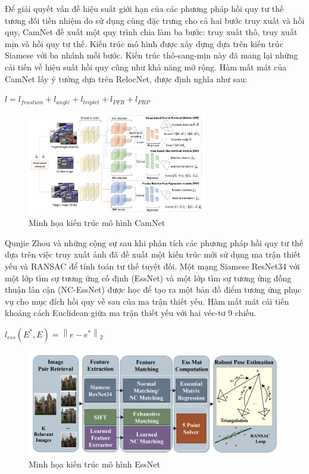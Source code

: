 Để giải quyết vấn đề hiệu suất giới hạn của các phương pháp hồi quy tư thế tương đối tiền nhiệm do sử dụng cùng đặc trưng cho cả hai bước truy xuất và hồi quy, CamNet \cite{9008579} đề xuất một quy trình chia làm ba bước: truy xuất thô, truy xuất mịn và hồi quy tư thế. Kiến trúc mô hình được xây dựng dựa trên kiến trúc Siamese với ba nhánh mỗi bước. Kiến trúc thô-sang-mịn này đã mang lại những cải tiến về hiệu suất hồi quy cũng như khả năng mở rộng. Hàm mất mát của CamNet lấy ý tưởng dựa trên RelocNet, được định nghĩa như sau:
\begin{center}
    $l = l_{frustum} + l_{angle} + l_{triplet} + l_{PFR} + l_{PRP}$
\end{center}
\begin{figure}[H]
    \centering
    \includegraphics[width=0.7\textwidth]{pics/Chapter2/camnet.png}
    \caption{Minh họa kiến trúc mô hình CamNet \cite{9008579}}
\end{figure}
Qunjie Zhou và những cộng sự \cite{zhou2020learn} sau khi phân tích các phương pháp hồi quy tư thế dựa trên việc truy xuất ảnh đã đề xuất một kiến trúc mới sử dụng ma trận thiết yếu và RANSAC để tính toán tư thế tuyệt đối. Một mạng Siamese ResNet34 với một lớp tìm sự tương ứng cố định (EssNet) và một lớp tìm sự tương ứng đồng thuận lân cận (NC-EssNet) được học để tạo ra một bản đồ điểm tương ứng phục vụ cho mục đích hồi quy về sau của ma trận thiết yếu. Hàm mất mát cải tiến khoảng cách Euclidean giữa ma trận thiết yếu với hai véc-tơ 9 chiều.
\begin{center}
    $l_{ess}(E^*, E) = \left \| e - e^* \right \|_2$
\end{center}
\begin{figure}[H]
    \centering
    \includegraphics[width=\textwidth]{pics/Chapter2/essnet.png}
    \caption{Minh họa kiến trúc mô hình EssNet \cite{zhou2020learn}}
\end{figure}

